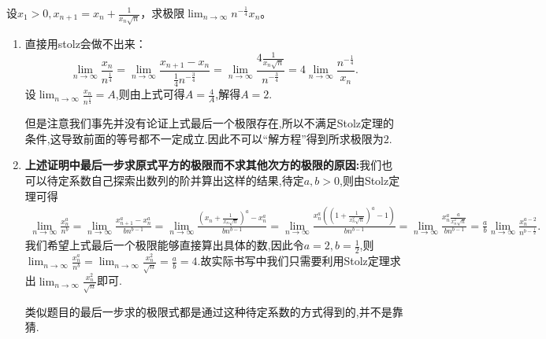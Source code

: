 \documentclass[../../main.tex]{subfiles}%
\begin{document}
\begin{example}\label{example4.47231}
设\(x_1 > 0,x_{n + 1}=x_n+\frac{1}{x_n\sqrt{n}}\)，求极限\(\lim_{n\rightarrow\infty}n^{-\frac{1}{4}}x_n\)。
\end{example}
\begin{note}
\begin{enumerate}
\item 直接用stolz会做不出来：
\[
\lim_{n\rightarrow \infty} \frac{x_n}{n^{\frac{1}{4}}}=\lim_{n\rightarrow \infty} \frac{x_{n+1}-x_n}{\frac{1}{4}n^{-\frac{3}{4}}}=\lim_{n\rightarrow \infty} \frac{4\frac{1}{x_n\sqrt{n}}}{n^{-\frac{3}{4}}}=4\lim_{n\rightarrow \infty} \frac{n^{-\frac{1}{4}}}{x_n}.
\]
设$\lim_{n\rightarrow \infty} \frac{x_n}{n^{\frac{1}{4}}}=A$,则由上式可得$A=\frac{4}{A}$,解得$A=2$.

但是注意我们事先并没有论证上式最后一个极限存在,所以不满足Stolz定理的条件,这导致前面的等号都不一定成立.因此不可以“解方程”得到所求极限为\(2\).

\item \textbf{上述证明中最后一步求原式平方的极限而不求其他次方的极限的原因:}我们也可以待定系数自己探索出数列的阶并算出这样的结果,待定$a,b>0$,则由Stolz定理可得
\begin{align*}
\lim_{n\rightarrow \infty} \frac{x_{n}^{a}}{n^b}=\lim_{n\rightarrow \infty} \frac{x_{n+1}^{a}-x_{n}^{a}}{bn^{b-1}}=\lim_{n\rightarrow \infty} \frac{\left( x_n+\frac{1}{x_n\sqrt{n}} \right) ^a-x_{n}^{a}}{bn^{b-1}}=\lim_{n\rightarrow \infty} \frac{x_{n}^{a}\left( \left( 1+\frac{1}{x_{n}^{2}\sqrt{n}} \right) ^a-1 \right)}{bn^{b-1}}
=\lim_{n\rightarrow \infty} \frac{x_{n}^{a}\frac{a}{x_{n}^{2}\sqrt{n}}}{bn^{b-1}}=\frac{a}{b}\lim_{n\rightarrow \infty} \frac{x_{n}^{a-2}}{n^{b-\frac{1}{2}}}.
\end{align*}
我们希望上式最后一个极限能够直接算出具体的数,因此令$a=2,b=\frac{1}{2}$,则$\lim_{n\rightarrow \infty} \frac{x_{n}^{a}}{n^b}=\lim_{n\rightarrow \infty} \frac{x_{n}^{2}}{\sqrt{n}}=\frac{a}{b}=4$.故实际书写中我们只需要利用Stolz定理求出\(\lim_{n\rightarrow\infty}\frac{x_n^{2}}{\sqrt{n}}\)即可.

类似题目的最后一步求的极限式都是通过这种待定系数的方式得到的,并不是靠猜.
\end{enumerate}
\end{note}
\end{document}
